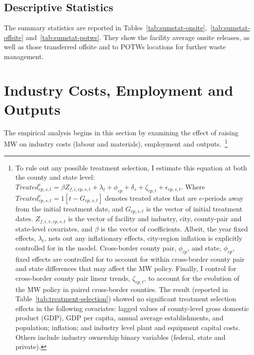 \documentclass[12pt, english]{article}
\begin{document}
    \subsection{Descriptive Statistics}\label{subsec:descriptive-statistics}
    The summary statistics are reported in Tables~\ref{tab:sumstat-onsite},~\ref{tab:sumstat-offsite} and~\ref{tab:sumstat-potws}. They show the facility average onsite releases, as well as those transferred offsite and to POTWs locations for further waste management.
    
    
    
%    


    \section{Industry Costs, Employment and Outputs}\label{sec:industry-costs-employment-and-outputs}
    The empirical analysis begins in this section by examining the effect of raising MW on industry costs (labour and materials), employment and outputs.~\footnote{\tiny To rule out any possible treatment selection, I estimate this equation at both the county and state level: $Treated_{cp,s,t}^e = \beta Z_{f,i,cp,s,t} + \lambda_{t} + \phi_{cp} + \delta_{s} + \zeta_{cp,t} + \epsilon_{cp,s,t}$. Where $Treated_{cp,s,t}^e = 1[t - G_{cp,s,t}]$ denotes treated states that are $e$-periods away from the initial treatment date, and $G_{cp,s,t}$ is the vector of initial treatment dates. $Z_{f,i,v,cp,s,t}$ is the vector of facility and industry, city, county-pair and state-level covariates, and $\beta$ is the vector of coefficients. Albeit, the year fixed effects, $\lambda_{t}$, nets out any inflationary effects, city-region inflation is explicitly controlled for in the model. Cross-border county pair, $\phi_{cp}$, and state, $\phi_{cp}$, fixed effects are controlled for to account for within cross-border county pair and state differences that may affect the MW policy. Finally, I control for cross-border county pair linear trends, $\zeta_{cp,t}$, to account for the evolution of the MW policy in paired cross-border counties. The result (reported in Table~\ref{tab:treatment-selection}) showed no significant treatment selection effects in the following covariates: lagged values of county-level gross domestic product (GDP), GDP per capita, annual average establishments, and population; inflation; and industry level plant and equipment capital costs. Others include industry ownership binary variables (federal, state and private).}
\end{document}
